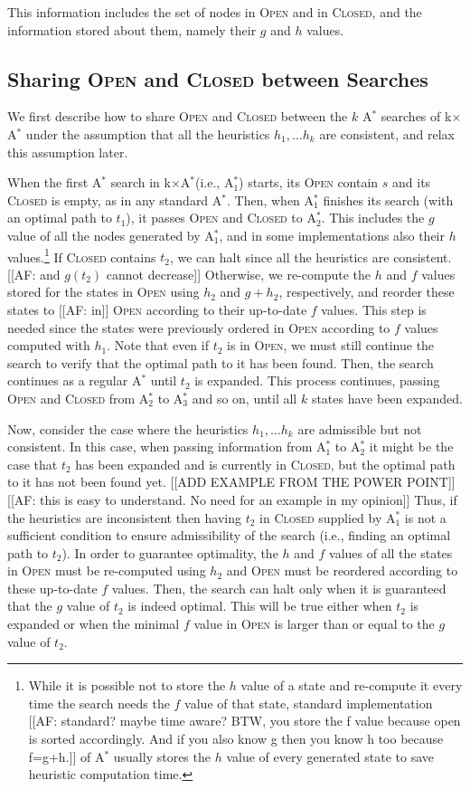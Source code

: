 \documentclass[twoside,11pt]{article}
\newcommand{\astar}{A$^*$\xspace}
\newcommand{\kxastar}{k$\times$A$^*$\xspace}
\newcommand{\astari}[1]{A$^*_#1$\xspace}
\newcommand{\open}{\textsc{Open}\xspace}
\newcommand{\closed}{\textsc{Closed}\xspace}
\begin{document}
This information includes the set of nodes in \open and in \closed, and the information stored about them, namely their $g$ and $h$ values. 


\subsection{Sharing \open and \closed between Searches}

We first describe how to share \open and \closed between the $k$ \astar searches of \kxastar under the assumption that all the heuristics $h_1, \ldots h_k$ are consistent, and relax this assumption later. 

When the first \astar search in \kxastar (i.e., \astari{1}) starts, its \open contain $s$ and its \closed is empty, as in any standard \astar.
Then, when \astari{1} finishes its search (with an optimal path to $t_1$), it passes \open and \closed to \astari{2}.
This includes the $g$ value of all the nodes generated by \astari{1}, and in some implementations also their $h$ values.\footnote{While it is possible not to store the $h$ value of a state and re-compute it every time the search needs the $f$ value of that state, standard implementation [[AF: standard? maybe time aware? BTW, you store the f value because open is sorted accordingly. And if you also know g then you know h too because f=g+h.]] of \astar usually stores the $h$ value of every generated state to save heuristic computation time.} 
If \closed contains $t_2$, we can halt since all the heuristics are consistent.[[AF: and $g(t_2)$ cannot decrease]]
Otherwise, we re-compute the $h$ and $f$ values stored for the states in \open using $h_2$ and $g+h_2$, respectively, and reorder these states to [[AF: in]] \open according to their up-to-date $f$ values.
This step is needed since the states were previously ordered in \open according to $f$ values computed with $h_1$.
Note that even if $t_2$ is in \open, we must still continue the search to verify that the optimal path to it has been found.
Then, the search continues as a regular \astar until $t_2$ is expanded.
This process continues, passing \open and \closed from \astari{2} to \astari{3} and so on, until all $k$ states have been expanded.

Now, consider the case where the heuristics $h_1, \ldots h_k$ are admissible but not consistent.
In this case, when passing information from \astari{1} to \astari{2} it might be the case that $t_2$ has been expanded and is currently in \closed, but the optimal path to it has not been found yet.
[[ADD EXAMPLE FROM THE POWER POINT]][[AF: this is easy to understand. No need for an example in my opinion]]
Thus, if the heuristics are inconsistent then having $t_2$ in \closed supplied by \astari{1} is not a sufficient condition to ensure admissibility of the search (i.e., finding an optimal path to $t_2$).
In order to guarantee optimality, the $h$ and $f$ values of all the states in \open must be re-computed using $h_2$ and \open must be reordered according to these up-to-date $f$ values.
Then, the search can halt only when it is guaranteed that the $g$ value of $t_2$ is indeed optimal. This will be true either when $t_2$ is expanded or when the minimal $f$ value in \open is larger than or equal to the $g$ value of $t_2$.
\end{document}
